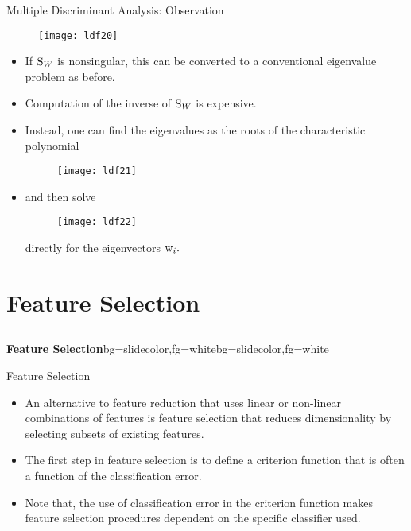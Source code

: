 \begin{frame}{Multiple Discriminant Analysis: Observation}

\begin{figure}
\texttt{[image: ldf20]}
\end{figure}
\begin{itemize}
\item If ${\rm S}_W$ is nonsingular, this can be converted to a conventional eigenvalue problem as before. 
\item Computation of the inverse of ${\rm S}_W$ is expensive.
\item Instead, one can find the eigenvalues as the roots of the characteristic polynomial
\begin{figure}
\texttt{[image: ldf21]}
\end{figure}
\item and then solve
\begin{figure}
\texttt{[image: ldf22]}
\end{figure}
directly for the eigenvectors ${\rm w}_i.$
\end{itemize}
\end{frame}


\section{Feature Selection}
\subsection{}
\begin{frame}{}
\begin{variableblock}{\centering \Large \textbf{\vspace{4pt}\newline Feature Selection\vspace{4pt}}}{bg=slidecolor,fg=white}{bg=slidecolor,fg=white}
\end{variableblock}
\end{frame}

\begin{frame}{Feature Selection}
\begin{itemize}
\item An alternative to feature reduction that uses linear or
non-linear combinations of features is feature selection that
reduces dimensionality by selecting subsets of existing
features.
\item The first step in feature selection is to define a criterion
function that is often a function of the classification error.
\item Note that, the use of classification error in the criterion function makes feature selection procedures dependent on
the specific classifier used.
\end{itemize}
\end{frame}

